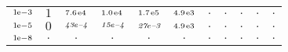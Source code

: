 \begin{tiny}
\begin{tabular}{@{$\;$}c@{$\;$}|@{$\;$}c@{$\;$}@{$\;$}c@{$\;$}@{$\;$}c@{$\;$}@{$\;$}c@{$\;$}@{$\;$}c@{$\;$}|@{$\;$}c@{$\;$}@{$\;$}c@{$\;$}@{$\;$}c@{$\;$}@{$\;$}c@{$\;$}@{$\;$}c@{$\;$}}
$\scriptstyle1\!\mathrm{\hspace{0.10em}e}-3$ & $\scriptstyle1$ & $\scriptstyle7.6\mathrm{\hspace{0.10em}e}4$ & $\scriptstyle1.0\mathrm{\hspace{0.10em}e}4$ & $\scriptstyle1.7\mathrm{\hspace{0.10em}e}5$ & $\scriptstyle4.9\mathrm{\hspace{0.10em}e}3$ & $\scriptstyle.$ & $\scriptstyle.$ & $\scriptstyle.$ & $\scriptstyle.$ & $\scriptstyle.$\\ 
$\scriptstyle1\!\mathrm{\hspace{0.10em}e}-5$ & $\scriptstyle0$ & $\scriptstyle\textit{43}\hspace{0.00em}e\textit{--4}$ & $\scriptstyle\textit{15}\hspace{0.00em}e\textit{--4}$ & $\scriptstyle\textit{27}\hspace{0.00em}e\textit{--3}$ & $\scriptstyle4.9\mathrm{\hspace{0.10em}e}3$ & $\scriptstyle.$ & $\scriptstyle.$ & $\scriptstyle.$ & $\scriptstyle.$ & $\scriptstyle.$\\ 
$\scriptstyle1\!\mathrm{\hspace{0.10em}e}-8$ & $\scriptstyle.$ & $\scriptstyle.$ & $\scriptstyle.$ & $\scriptstyle.$ & $\scriptstyle.$ & $\scriptstyle.$ & $\scriptstyle.$ & $\scriptstyle.$ & $\scriptstyle.$ & $\scriptstyle.$\\ 
\end{tabular} 
\end{tiny} 
